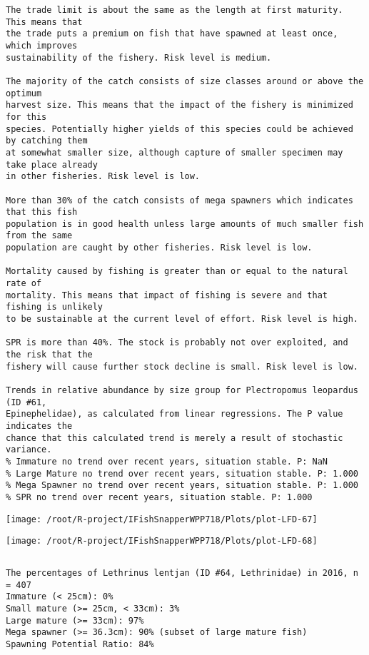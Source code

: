 \documentclass{report}\usepackage[]{graphicx}\usepackage[]{color}
\makeatletter
\def\maxwidth{ %
  \ifdim\Gin@nat@width>\linewidth
    \linewidth
  \else
    \Gin@nat@width
  \fi
}
\newenvironment{kframe}{%
 \def\at@end@of@kframe{}%
 \ifinner\ifhmode%
  \def\at@end@of@kframe{\end{minipage}}%
  \begin{minipage}{\columnwidth}%
 \fi\fi%
 \def\FrameCommand##1{\hskip\@totalleftmargin \hskip-\fboxsep
 \colorbox{shadecolor}{##1}\hskip-\fboxsep
     \hskip-\linewidth \hskip-\@totalleftmargin \hskip\columnwidth}%
 \MakeFramed {\advance\hsize-\width
   \@totalleftmargin\z@ \linewidth\hsize
   \@setminipage}}%
 {\par\unskip\endMakeFramed%
 \at@end@of@kframe}
\newenvironment{knitrout}{}{} %
\makeatother
\begin{document}
\begin{knitrout}
\begin{kframe}
\begin{verbatim}
The trade limit is about the same as the length at first maturity.  This means that
the trade puts a premium on fish that have spawned at least once, which improves
sustainability of the fishery. Risk level is medium.

The majority of the catch consists of size classes around or above the optimum
harvest size. This means that the impact of the fishery is minimized for this
species. Potentially higher yields of this species could be achieved by catching them
at somewhat smaller size, although capture of smaller specimen may take place already
in other fisheries. Risk level is low.

More than 30% of the catch consists of mega spawners which indicates that this fish
population is in good health unless large amounts of much smaller fish from the same
population are caught by other fisheries. Risk level is low.
 
Mortality caused by fishing is greater than or equal to the natural rate of
mortality. This means that impact of fishing is severe and that fishing is unlikely
to be sustainable at the current level of effort. Risk level is high.
 
SPR is more than 40%. The stock is probably not over exploited, and the risk that the
fishery will cause further stock decline is small. Risk level is low.
 
Trends in relative abundance by size group for Plectropomus leopardus (ID #61,
Epinephelidae), as calculated from linear regressions. The P value indicates the
chance that this calculated trend is merely a result of stochastic variance.
% Immature no trend over recent years, situation stable. P: NaN
% Large Mature no trend over recent years, situation stable. P: 1.000
% Mega Spawner no trend over recent years, situation stable. P: 1.000
% SPR no trend over recent years, situation stable. P: 1.000
\end{verbatim}
\end{kframe}
\texttt{[image: /root/R-project/IFishSnapperWPP718/Plots/plot-LFD-67]} 

\texttt{[image: /root/R-project/IFishSnapperWPP718/Plots/plot-LFD-68]} 
\begin{kframe}\begin{verbatim}
\end{verbatim}
\end{kframe}
\clearpage
\newpage
\begin{kframe}\begin{verbatim}The percentages of Lethrinus lentjan (ID #64, Lethrinidae) in 2016, n = 407
Immature (< 25cm): 0%
Small mature (>= 25cm, < 33cm): 3%
Large mature (>= 33cm): 97%
Mega spawner (>= 36.3cm): 90% (subset of large mature fish)
Spawning Potential Ratio: 84%
 

\end{verbatim}
\end{kframe}
\end{knitrout}
\end{document}
